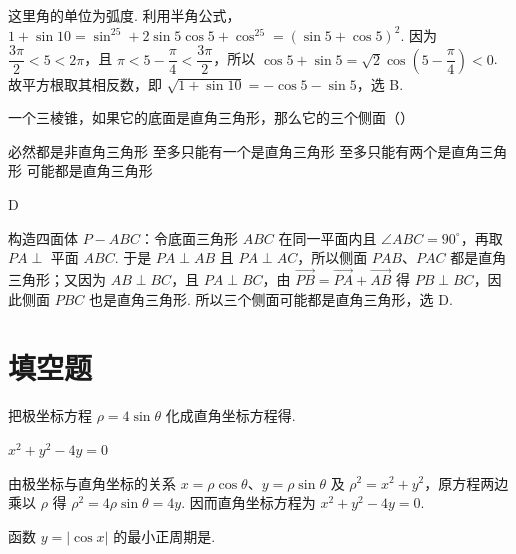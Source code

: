 \documentclass[UTF8,a4paper,oneside,11pt]{ctexbook}
\begin{document}
\begin{solution}
这里角的单位为弧度. 利用半角公式，\(1+\sin10=\sin^25+2\sin5\cos5+\cos^25=(\sin5+\cos5)^2\). 因为 \(\dfrac{3\pi}{2}<5<2\pi\)，且 \(\pi<5-\dfrac\pi4<\dfrac{3\pi}{2}\)，所以 \(\cos5+\sin5=\sqrt2\cos\left(5-\dfrac\pi4\right)<0\). 故平方根取其相反数，即 \(\sqrt{1+\sin10}=-\cos5-\sin5\)，选 B.
\end{solution}

\begin{problem}
一个三棱锥，如果它的底面是直角三角形，那么它的三个侧面（\quad）

\choices
    {必然都是非直角三角形}
    {至多只能有一个是直角三角形}
    {至多只能有两个是直角三角形}
    {可能都是直角三角形}
\end{problem}

\begin{answer}
D
\end{answer}

\begin{solution}
构造四面体 \(P-ABC\)：令底面三角形 \(ABC\) 在同一平面内且 \(\angle ABC=90^{\circ}\)，再取 \(PA\perp\) 平面 \(ABC\). 于是 \(PA\perp AB\) 且 \(PA\perp AC\)，所以侧面 \(PAB\)、\(PAC\) 都是直角三角形；又因为 \(AB\perp BC\)，且 \(PA\perp BC\)，由 \(\overrightarrow{PB}=\overrightarrow{PA}+\overrightarrow{AB}\) 得 \(PB\perp BC\)，因此侧面 \(PBC\) 也是直角三角形. 所以三个侧面可能都是直角三角形，选 D.
\end{solution}

\section{填空题}

\begin{problem}
把极坐标方程 \(\rho = 4\sin \theta\) 化成直角坐标方程得\fillinblank{}.
\end{problem}

\begin{answer}
\(x^2 + y^2 - 4y = 0\)
\end{answer}

\begin{solution}
由极坐标与直角坐标的关系 \(x=\rho\cos\theta\)、\(y=\rho\sin\theta\) 及 \(\rho^2=x^2+y^2\)，原方程两边乘以 \(\rho\) 得 \(\rho^2=4\rho\sin\theta=4y\). 因而直角坐标方程为 \(x^2+y^2-4y=0\).
\end{solution}

\begin{problem}
函数 \(y = |\cos x|\) 的最小正周期是\fillinblank{}.
\end{problem}
\end{document}
